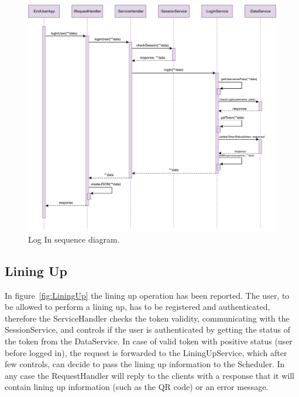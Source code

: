 \begin{figure}[H]
	\centering
	\includegraphics[width=1.0\textwidth]{images/logIn_sequence_diagram.pdf}
	\caption{Log In sequence diagram.}\label{fig:LogIn}
\end{figure}

\subsection{Lining Up}

In figure~\ref{fig:LiningUp} the lining up operation has been reported.
The user, to be allowed to perform a lining up, has to be registered and authenticated, therefore the ServiceHandler checks the token validity, communicating with the SessionService, and controls if the user is authenticated by getting the status of the token from the DataService.
In case of valid token with positive status (user before logged in), the request is forwarded to the LiningUpService, which after few controls, can decide to pass the lining up information to the Scheduler.
In any case the RequestHandler will reply to the clients with a response that it will contain lining up information (such as the QR code) or an error message.

